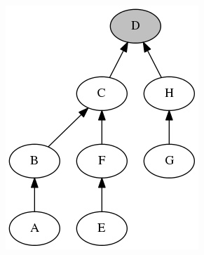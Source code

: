 \begin{figure}[H]
{\begin{subfigure}[b]{0.2\textwidth}
        \end{subfigure}%
        \begin{subfigure}[b]{0.3\textwidth}
            \includegraphics[width=\textwidth]{./figures/methodology/spatial_time_correlation/event_tree_graph_3.png}
            \caption{}\label{fig:network_events_locations_examples_3}
        \end{subfigure}
        \begin{subfigure}[b]{0.3\textwidth}

\end{subfigure}}
\end{figure}
